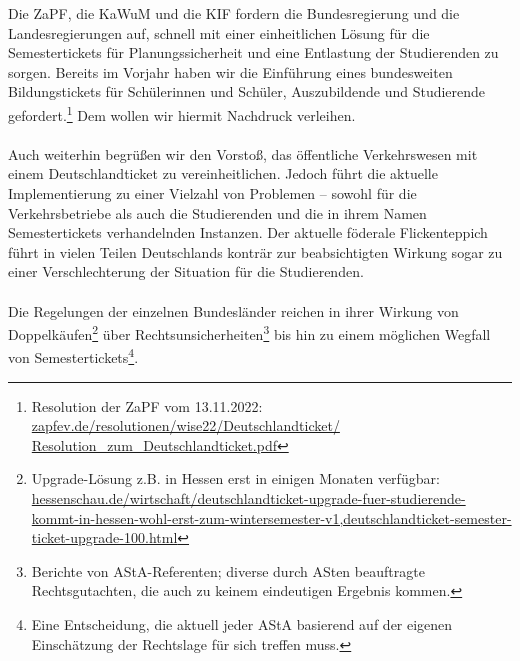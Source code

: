 \documentclass[DIV=calc]{scrartcl}
\begin{document}
Die ZaPF, die KaWuM und die KIF fordern die Bundesregierung und die Landesregierungen auf, schnell mit einer einheitlichen Lösung für die Semestertickets für Planungssicherheit und eine Entlastung der Studierenden zu sorgen.
Bereits im Vorjahr haben wir die Einführung eines bundesweiten Bildungstickets für Schülerinnen und Schüler, Auszubildende und Studierende gefordert.\footnote{Resolution der ZaPF vom 13.11.2022: \href{https://zapfev.de/resolutionen/wise22/Deutschlandticket/Resolution\_zum\_Deutschlandticket.pdf}{zapfev.de/resolutionen/wise22/Deutschlandticket/\\Resolution\_zum\_Deutschlandticket.pdf}} Dem wollen wir hiermit Nachdruck verleihen.\\\\
%
Auch weiterhin begrüßen wir den Vorstoß, das öffentliche Verkehrswesen mit einem Deutschlandticket zu vereinheitlichen. Jedoch führt die aktuelle Implementierung zu einer Vielzahl von Problemen -- sowohl für die Verkehrsbetriebe als auch die Studierenden und die in ihrem Namen Semestertickets verhandelnden Instanzen. Der aktuelle föderale Flickenteppich führt in vielen Teilen Deutschlands konträr zur beabsichtigten Wirkung sogar zu einer Verschlechterung der Situation für die Studierenden.\\\\
%
Die Regelungen der einzelnen Bundesländer reichen in ihrer Wirkung von Doppelkäufen\footnote{Upgrade-Lösung z.B. in Hessen erst in einigen Monaten verfügbar: \href{https://www.hessenschau.de/wirtschaft/deutschlandticket-upgrade-fuer-studierende-kommt-in-hessen-wohl-erst-zum-wintersemester-v1,deutschlandticket-semester-ticket-upgrade-100.html}{hessenschau.de/wirtschaft/deutschlandticket-upgrade-fuer-studierende-kommt-in-hessen-wohl-erst-zum-wintersemester-v1,deutschlandticket-semester-ticket-upgrade-100.html}} über Rechtsunsicherheiten\footnote{Berichte von AStA-Referenten; diverse durch ASten beauftragte Rechtsgutachten, die auch zu keinem eindeutigen Ergebnis kommen.} bis hin zu einem möglichen Wegfall von Semestertickets\footnote{Eine Entscheidung, die aktuell jeder AStA basierend auf der eigenen Einschätzung der Rechtslage für sich treffen muss.}.\\
%
\end{document}
